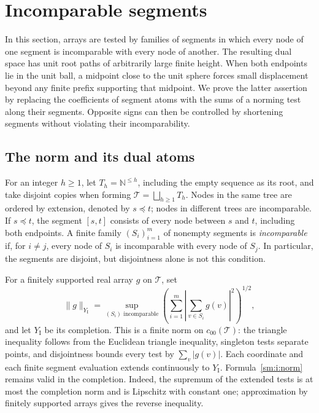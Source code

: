 \section{Incomparable segments}
\label{sm:i:section}

In this section, arrays are tested by families of segments in which every
node of one segment is incomparable with every node of another.  The resulting dual space has unit root paths of
arbitrarily large finite height. When both endpoints lie in the unit ball,
a midpoint close to the unit sphere forces small displacement beyond any
finite prefix supporting that midpoint. We prove the latter assertion by replacing the
coefficients of segment atoms with the sums of a norming test along their
segments.  Opposite signs can then be controlled by shortening segments
without violating their incomparability.

\subsection{The norm and its dual atoms}

For an integer $h\geq1$, let $T_h=\mathbb N^{\leq h}$, including the empty
sequence as its root, and take disjoint copies when forming
$\mathcal T=\bigsqcup_{h\geq1}T_h$.
Nodes in the same tree are ordered by extension, denoted by $s\preceq t$;
nodes in different trees are incomparable.  If $s\preceq t$, the segment
$[s,t]$ consists of every node between $s$ and $t$, including both
endpoints.  A finite family $(S_i)_{i=1}^m$ of nonempty segments is
\emph{incomparable} if, for $i\ne j$, every node of $S_i$ is incomparable
with every node of $S_j$.  In particular, the segments are disjoint, but
disjointness alone is not this condition.

For a finitely supported real array $g$ on $\mathcal T$, set
\begin{equation}
 \|g\|_{Y_{\mathrm I}}
 =\sup_{(S_i)\text{ incomparable}}
   \left(\sum_{i=1}^m
     \left|\sum_{v\in S_i}g(v)\right|^2\right)^{1/2},
 \label{sm:i:norm}
\end{equation}
and let $Y_{\mathrm I}$ be its completion.  This is a finite norm on
$c_{00}(\mathcal T)$: the triangle inequality follows from the Euclidean
triangle inequality, singleton tests separate points, and disjointness
bounds every test by $\sum_v|g(v)|$.
Each coordinate and each finite segment evaluation extends continuously
to $Y_{\mathrm I}$.  Formula~\eqref{sm:i:norm} remains valid in the
completion.  Indeed, the supremum of the extended tests is at most the
completion norm and is Lipschitz with constant one; approximation by
finitely supported arrays gives the reverse inequality.

